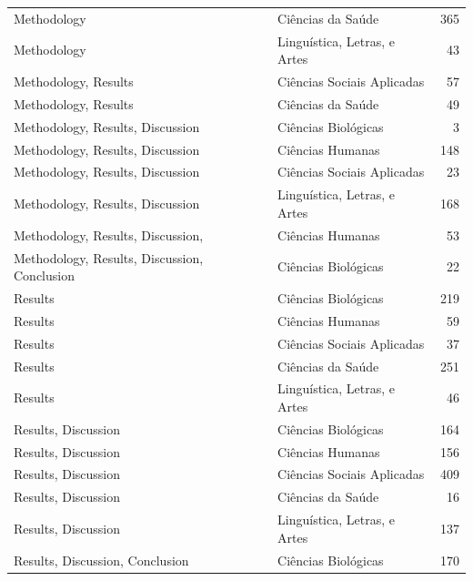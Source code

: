 \begin{longtable}{llr}
Methodology & Ciências da Saúde & 365 \\
Methodology & Linguística, Letras, e Artes & 43 \\
Methodology, Results & Ciências Sociais Aplicadas & 57 \\
Methodology, Results & Ciências da Saúde & 49 \\
Methodology, Results, Discussion & Ciências Biológicas & 3 \\
Methodology, Results, Discussion & Ciências Humanas & 148 \\
Methodology, Results, Discussion & Ciências Sociais Aplicadas & 23 \\
Methodology, Results, Discussion & Linguística, Letras, e Artes & 168 \\
Methodology, Results, Discussion, & Ciências Humanas & 53 \\
Methodology, Results, Discussion, Conclusion & Ciências Biológicas & 22 \\
Results & Ciências Biológicas & 219 \\
Results & Ciências Humanas & 59 \\
Results & Ciências Sociais Aplicadas & 37 \\
Results & Ciências da Saúde & 251 \\
Results & Linguística, Letras, e Artes & 46 \\
Results, Discussion & Ciências Biológicas & 164 \\
Results, Discussion & Ciências Humanas & 156 \\
Results, Discussion & Ciências Sociais Aplicadas & 409 \\
Results, Discussion & Ciências da Saúde & 16 \\
Results, Discussion & Linguística, Letras, e Artes & 137 \\
Results, Discussion, Conclusion & Ciências Biológicas & 170 \\
\end{longtable}
